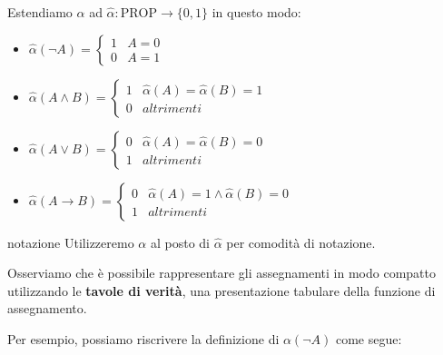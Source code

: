 \documentclass[a4paper,11pt]{report}
\begin{document}
Estendiamo \( \alpha \) ad \( \hat{\alpha} : \text{PROP} \to \{0,1\} \) in questo modo:
\vspace{0.5em}
\begin{itemize}
    \item \( \hat{\alpha}(\neg A) = \begin{cases}
            1 &  A = 0 \\
            0 & A = 1
        \end{cases}\)

        \vspace{0.5em}

    \item \( \hat{\alpha}(A \land B) = \begin{cases}
            1 & \hat{\alpha}(A) = \hat{\alpha}(B)  = 1 \\
            0 & altrimenti
        \end{cases}\)

        \vspace{0.5em}

    \item \( \hat{\alpha}(A \lor B) = \begin{cases}
            0 & \hat{\alpha}(A) = \hat{\alpha}(B)  = 0 \\
            1 & altrimenti
        \end{cases}\)

        \vspace{0.5em}

    \item \( \hat{\alpha}(A \to B) = \begin{cases}
            0 & \hat{\alpha}(A) = 1 \land \hat{\alpha}(B)  = 0 \\
            1 & altrimenti
        \end{cases}\)

\end{itemize}

\begin{gframe}{notazione}
    Utilizzeremo \( \alpha \) al posto di \( \hat{\alpha} \) per comodità di notazione.
\end{gframe}

Osserviamo che è possibile rappresentare gli assegnamenti in modo compatto utilizzando le \textbf{tavole di verità}, una presentazione tabulare della funzione di assegnamento.

Per esempio, possiamo riscrivere la definizione di \( \alpha(\neg A) \) come segue:
\end{document}
